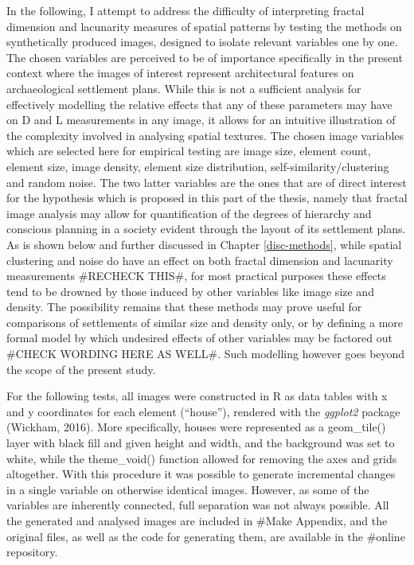 \documentclass[
  12pt,
]{book}
\begin{document}
In the following, I attempt to address the difficulty of interpreting fractal dimension and lacunarity measures of spatial patterns by testing the methods on synthetically produced images, designed to isolate relevant variables one by one. The chosen variables are perceived to be of importance specifically in the present context where the images of interest represent architectural features on archaeological settlement plans. While this is not a sufficient analysis for effectively modelling the relative effects that any of these parameters may have on D and L measurements in any image, it allows for an intuitive illustration of the complexity involved in analysing spatial textures. The chosen image variables which are selected here for empirical testing are image size, element count, element size, image density, element size distribution, self-similarity/clustering and random noise. The two latter variables are the ones that are of direct interest for the hypothesis which is proposed in this part of the thesis, namely that fractal image analysis may allow for quantification of the degrees of hierarchy and conscious planning in a society evident through the layout of its settlement plans. As is shown below and further discussed in Chapter \ref{disc-methods}, while spatial clustering and noise do have an effect on both fractal dimension and lacunarity measurements \#RECHECK THIS\#, for most practical purposes these effects tend to be drowned by those induced by other variables like image size and density. The possibility remains that these methods may prove useful for comparisons of settlements of similar size and density only, or by defining a more formal model by which undesired effects of other variables may be factored out \#CHECK WORDING HERE AS WELL\#. Such modelling however goes beyond the scope of the present study.

For the following tests, all images were constructed in R as data tables with x and y coordinates for each element (``house''), rendered with the \emph{ggplot2} package (Wickham, 2016). More specifically, houses were represented as a geom\_tile() layer with black fill and given height and width, and the background was set to white, while the theme\_void() function allowed for removing the axes and grids altogether. With this procedure it was possible to generate incremental changes in a single variable on otherwise identical images. However, as some of the variables are inherently connected, full separation was not always possible. All the generated and analysed images are included in \#Make Appendix, and the original files, as well as the code for generating them, are available in the \#online repository.
\end{document}
